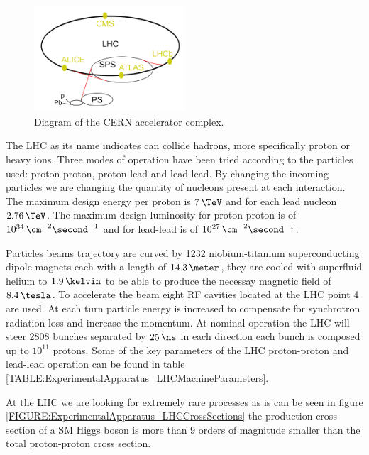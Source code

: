 \begin{figure}[!htb]
  \centering
  \includegraphics[width=0.50\textwidth]{Chapter02/LHC/Images/LHCAccelaratorChain.png}
  \caption{Diagram of the \gls{CERN} accelerator complex.}
  \label{FIGURE:ExperimentalApparatus_LHCAccelaratorChain}
\end{figure}

The \gls{LHC} as its name indicates can collide hadrons, more specifically proton or heavy ions. Three modes of operation have been tried according to the particles used: proton-proton, proton-lead and lead-lead. By changing the incoming particles we are changing the quantity of nucleons present at each interaction. The maximum design energy per proton is $7\,\TeV$ and for each lead nucleon $2.76\,\TeV$. The maximum design luminosity for proton-proton is of $10^{34}\,\cm^{-2}\second^{-1}$ and for lead-lead is of $10^{27}\,\cm^{-2}\second^{-1}$.

Particles beams trajectory are curved by 1232 niobium-titanium superconducting dipole magnets each with a length of $14.3\,\meter$, they are cooled with superfluid helium to $1.9\,\kelvin$ to be able to produce the necessay magnetic field of $8.4\,\tesla$. To accelerate the beam eight \gls{RF} cavities located at the \gls{LHC} point 4 are used. At each turn particle energy is increased to compensate for synchrotron radiation loss and increase the momentum. At nominal operation the \gls{LHC} will steer 2808 bunches separated by $25\,\ns$ in each direction each bunch is composed up to $10^{11}$ protons. Some of the key parameters of the \gls{LHC} proton-proton and lead-lead operation can be found in table \ref{TABLE:ExperimentalApparatus_LHCMachineParameters}.



At the \gls{LHC} we are looking for extremely rare processes as is can be seen in figure \ref{FIGURE:ExperimentalApparatus_LHCCrossSections} the production cross section of a \gls{SM} Higgs boson is more than 9 orders of magnitude smaller than the total proton-proton cross section. 

